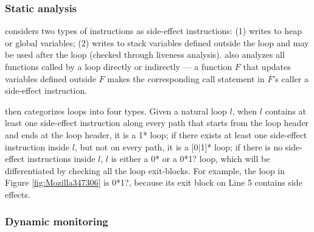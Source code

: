 
\subsubsection{Static analysis}
\label{sec:s_workless}

\Tool considers two types of instructions as side-effect instructions:
(1) writes to heap or global variables;
(2) writes to stack variables defined outside the loop and
may be used after the loop (checked through liveness analysis).
\Tool also analyzes all functions called
by a loop directly or indirectly --- a function $F$ that updates variables
defined outside $F$ makes the corresponding call statement in $F$'s
caller a side-effect instruction.

\Tool then categorizes loops into four types.
Given a natural loop $l$, when $l$
contains at least one side-effect instruction along every path that
starts from the loop header and ends at the loop header, it is a 1* loop;
if there exists at least one side-effect instruction inside $l$, but not on
every path,
it is a [0$|$1]* loop; if there is no side-effect instructions inside $l$,
$l$ is either a 0* or a 0*1? loop, which will be differentiated by checking
all the loop exit-blocks.
For example, the loop in Figure \ref{fig:Mozilla347306} is 0*1?, because 
its exit block on Line 5 contains side effects.


\subsubsection{Dynamic monitoring}
\label{sec:d_workless}

